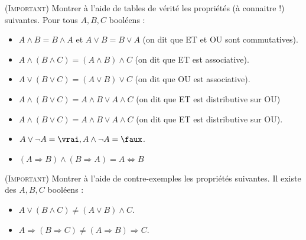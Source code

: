 \begin{rlined}
    \begin{exo}(\textsc{Important})\label{exo:bool}
        Montrer à l'aide de tables de vérité les propriétés (à connaitre !) suivantes.
        Pour tous $A, B, C$ booléens :
        \begin{itemize}
            \item $A \wedge B = B \wedge A$ et $A \vee B = B \vee A$ (on dit que ET et OU sont commutatives).
            \item $A\wedge(B\wedge C) = (A\wedge B)\wedge C$ (on dit que ET est associative).
            \item $A\vee(B\vee C) = (A\vee B)\vee C$ (on dit que OU est associative).
            \item $A \wedge (B \vee C) = A \wedge B \vee A \wedge C$ (on dit que ET est distributive sur OU)
            \item $A \wedge (B \vee C) = A \wedge B \vee A \wedge C$ (on dit que ET est distributive sur OU).
            \item $A \vee \neg A = \vrai, A \wedge \neg A = \faux$.
            \item $(A \Rightarrow B) \wedge (B \Rightarrow A) = A \Leftrightarrow B$
        \end{itemize}
    \end{exo}
    \begin{exo}(\textsc{Important})
        Montrer à l'aide de contre-exemples les propriétés suivantes.
        Il existe des $A, B, C$ booléens :
        \begin{itemize}
            \item $A \vee (B \wedge C) \neq (A \vee B) \wedge C$.
            \item $A \Rightarrow (B \Rightarrow C) \neq (A \Rightarrow B) \Rightarrow C$.
        \end{itemize}
    \end{exo}
\end{rlined}

\newpage